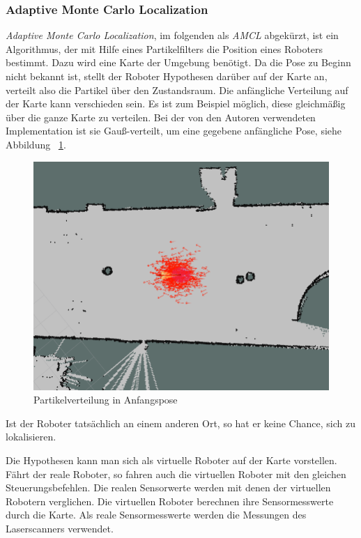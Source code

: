 \documentclass[11pt,a4paper]{article}
\begin{document}
\subsubsection{Adaptive Monte Carlo Localization \cite{mclWiki} \cite{amclPaper}} 
{
	\textit{Adaptive Monte Carlo Localization}, im folgenden als \textit{AMCL} abgek\"urzt, ist ein Algorithmus, der mit Hilfe eines Partikelfilters die Position eines Roboters bestimmt. Dazu wird eine Karte der Umgebung ben\"otigt. Da die Pose zu Beginn nicht bekannt ist, stellt der Roboter Hypothesen dar\"uber auf der Karte an, verteilt also die Partikel \"uber den Zustandsraum. Die anf\"angliche Verteilung auf der Karte kann verschieden sein. Es ist zum Beispiel m\"oglich, diese  gleichm\"a{\ss}ig \"uber die ganze Karte zu verteilen. 
	Bei der von den Autoren verwendeten Implementation ist sie Gau{\ss}-verteilt, um eine gegebene anf\"angliche Pose, siehe Abbildung ~\ref{fig:initalParticleDistribution}. \begin{figure}[h]
		\includegraphics[width=\linewidth]{pictures/initial_distribution.jpg}
		\caption{Partikelverteilung in Anfangspose \label{fig:initalParticleDistribution}}
	\end{figure}
	\newpage
	Ist der Roboter tats\"achlich an einem anderen Ort, so hat er keine Chance, sich zu lokalisieren. 
	
	Die Hypothesen kann man sich als virtuelle Roboter auf der Karte vorstellen. F\"ahrt der reale Roboter, so fahren auch die virtuellen Roboter mit den gleichen Steuerungsbefehlen. Die realen Sensorwerte werden mit denen der virtuellen Robotern verglichen. Die virtuellen Roboter berechnen ihre Sensormesswerte durch die Karte. Als reale Sensormesswerte werden die Messungen des Laserscanners verwendet. 
	
}
\end{document}
